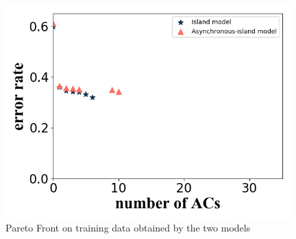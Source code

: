 \documentclass[conference]{IEEEtran}
\begin{document}
\begin{figure}[H]
    \begin{minipage}[t]{0.25\textwidth}
    \includegraphics[width=0.98\textwidth]{figures/diffModelTrain3.png}
    \end{minipage}
    \caption{Pareto Front on training data obtained by the two models}
    \label{diffModelTr}
  \end{figure}
\end{document}
